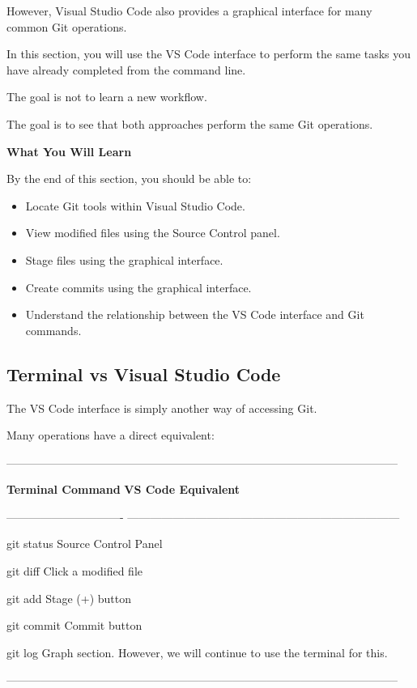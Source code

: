 \documentclass{csc2059practical}
\begin{document}
However, Visual Studio Code also provides a graphical interface for many common Git operations.

In this section, you will use the VS Code interface to perform the same tasks you have already completed from the command line.

The goal is not to learn a new workflow.

The goal is to see that both approaches perform the same Git operations.

\begin{learningoutcomes}
\textbf{What You Will Learn}\par
\medskip
By the end of this section, you should be able to:

\begin{itemize}
  \item Locate Git tools within Visual Studio Code.
  \item View modified files using the Source Control panel.
  \item Stage files using the graphical interface.
  \item Create commits using the graphical interface.
  \item Understand the relationship between the VS Code interface and Git commands.
\end{itemize}
\end{learningoutcomes}
\subsection{Terminal vs Visual Studio Code}
The VS Code interface is simply another way of accessing Git.

Many operations have a direct equivalent:

--------------------------------------------------------------------------------------------------------

\textbf{Terminal Command}            \textbf{VS Code Equivalent}

------------------------------- ------------------------------------------------------------------------

\begin{terminalplain}
git status                      Source Control Panel
\end{terminalplain}
\begin{terminalplain}
git diff                        Click a modified file
\end{terminalplain}
\begin{terminalplain}
git add                         Stage (+) button
\end{terminalplain}
\begin{terminalplain}
git commit                      Commit button
\end{terminalplain}
\begin{terminalplain}
git log                         Graph section. However, we will continue to use the terminal for this.
\end{terminalplain}
--------------------------------------------------------------------------------------------------------
\end{document}
